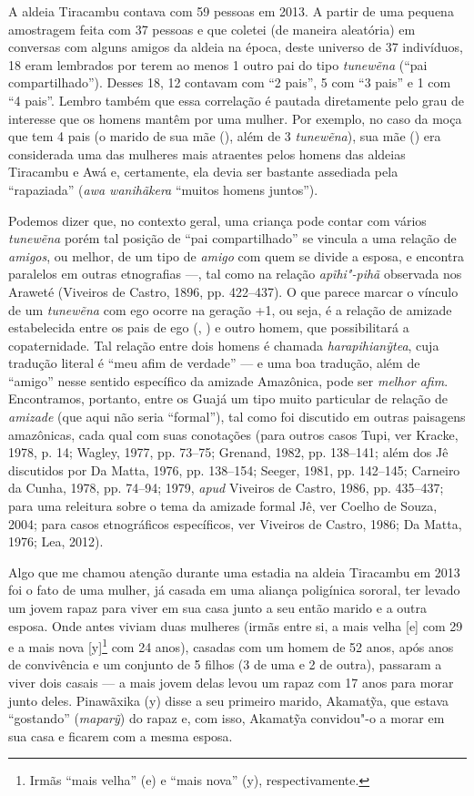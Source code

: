A aldeia Tiracambu contava com 59 pessoas em 2013. A partir de uma
pequena amostragem feita com 37 pessoas e que coletei (de maneira
aleatória) em conversas com alguns amigos da aldeia na época, deste
universo de 37 indivíduos, 18 eram lembrados por terem ao menos 1 outro
pai do tipo \emph{tunewẽna} (``pai compartilhado''). Desses 18, 12
contavam com ``2 pais'', 5 com ``3 pais'' e 1 com ``4 pais''. Lembro
também que essa correlação é pautada diretamente pelo grau de interesse
que os homens mantêm por uma mulher. Por exemplo, no caso da moça que
tem 4 pais (o marido de sua mãe (), além de 3 \emph{tunewẽna}), sua mãe
() era considerada uma das mulheres mais atraentes pelos homens das
aldeias Tiracambu e Awá e, certamente, ela devia ser
bastante assediada pela ``rapaziada'' (\emph{awa wanihãkera} ``muitos
homens juntos'').

Podemos dizer que, no contexto geral, uma criança pode contar com vários
\emph{tunewẽna} porém tal posição de ``pai compartilhado'' se vincula a
uma relação de \emph{amigos}, ou melhor, de um tipo de \emph{amigo} com
quem se divide a esposa, e encontra paralelos em outras etnografias ---,
tal como na relação \emph{apĩhi"-pihã} observada nos Araweté (Viveiros de
Castro, 1896, pp. 422--437). O que parece marcar o vínculo de um
\emph{tunewẽna} com ego ocorre na geração +1, ou seja, é a relação de
amizade estabelecida entre os pais de ego (, ) e outro homem, que
possibilitará a copaternidade. Tal relação entre dois homens é chamada
\emph{harapihianỹtea}, cuja tradução literal é ``meu afim de verdade'' ---
e uma boa tradução, além de ``amigo'' nesse sentido específico da
amizade Amazônica, pode ser \emph{melhor afim}. Encontramos, portanto,
entre os Guajá um tipo muito particular de relação de \emph{amizade}
(que aqui não seria ``formal''), tal como foi discutido em outras
paisagens amazônicas, cada qual com suas conotações (para outros casos
Tupi, ver Kracke, 1978, p. 14; Wagley, 1977, pp. 73--75; Grenand, 1982,
pp. 138--141; além dos Jê discutidos por Da Matta, 1976, pp. 138--154; Seeger,
1981, pp. 142--145; Carneiro da Cunha, 1978, pp. 74--94; 1979, \emph{apud} Viveiros de
Castro, 1986, pp. 435--437; para uma releitura sobre o tema da amizade
formal Jê, ver Coelho de Souza, 2004; para casos etnográficos
específicos, ver Viveiros de Castro, 1986; Da Matta, 1976; Lea, 2012).

Algo que me chamou atenção durante uma estadia na aldeia Tiracambu em
2013 foi o fato de uma mulher, já casada em uma aliança poligínica
sororal, ter levado um jovem rapaz para viver em sua casa junto a seu
então marido e a outra esposa. Onde antes viviam duas mulheres (irmãs
entre si, a mais velha [e] com 29 e a mais nova [y]\footnote{Irmãs
  ``mais velha'' (e) e ``mais nova'' (y), respectivamente.} com 24
anos), casadas com um homem de 52 anos, após anos de convivência e um
conjunto de 5 filhos (3 de uma e 2 de outra), passaram a viver dois
casais --- a mais jovem delas levou um rapaz com 17 anos para morar junto
deles. Pinawãxika (y) disse a seu primeiro marido, Akamatỹa, que estava
``gostando'' (\emph{maparỹ}) do rapaz e, com isso, Akamatỹa convidou"-o a
morar em sua casa e ficarem com a mesma esposa.

